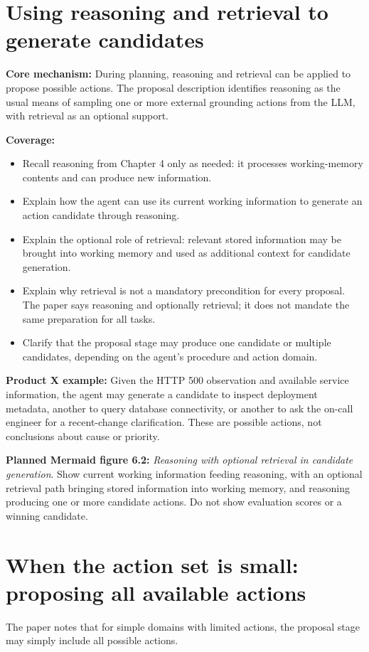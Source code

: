 \section{Using reasoning and retrieval to generate candidates}
\textbf{Core mechanism:} During planning, reasoning and retrieval can be applied to propose possible actions. The proposal description identifies reasoning as the usual means of sampling one or more external grounding actions from the LLM, with retrieval as an optional support.

\textbf{Coverage:}
\begin{itemize}
  \item Recall reasoning from Chapter 4 only as needed: it processes working-memory contents and can produce new information.
  \item Explain how the agent can use its current working information to generate an action candidate through reasoning.
  \item Explain the optional role of retrieval: relevant stored information may be brought into working memory and used as additional context for candidate generation.
  \item Explain why retrieval is not a mandatory precondition for every proposal. The paper says reasoning and optionally retrieval; it does not mandate the same preparation for all tasks.
  \item Clarify that the proposal stage may produce one candidate or multiple candidates, depending on the agent's procedure and action domain.
\end{itemize}

\textbf{Product X example:} Given the HTTP 500 observation and available service information, the agent may generate a candidate to inspect deployment metadata, another to query database connectivity, or another to ask the on-call engineer for a recent-change clarification. These are possible actions, not conclusions about cause or priority.

\textbf{Planned Mermaid figure 6.2:} \emph{Reasoning with optional retrieval in candidate generation}. Show current working information feeding reasoning, with an optional retrieval path bringing stored information into working memory, and reasoning producing one or more candidate actions. Do not show evaluation scores or a winning candidate.

\section{When the action set is small: proposing all available actions}
The paper notes that for simple domains with limited actions, the proposal stage may simply include all possible actions.

